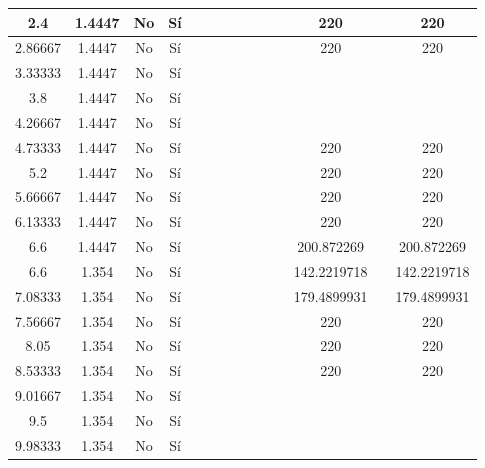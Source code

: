 \begin{table}[H]
{\begin{tabular}{|c|c|c|c|c|c|c|c|c|c|c|c|c|c|}
\hline
2.4 & 1.4447 & No  & Sí  &     &     &     &     &     &     &     & 220 &     & 220 \bigstrut\\
\hline
2.86667 & 1.4447 & No  & Sí  &     &     &     &     &     &     &     & 220 &     & 220 \bigstrut\\
\hline
3.33333 & 1.4447 & No  & Sí  &     &     &     &     &     &     &     &     &     &  \bigstrut\\
\hline
3.8 & 1.4447 & No  & Sí  &     &     &     &     &     &     &     &     &     &  \bigstrut\\
\hline
4.26667 & 1.4447 & No  & Sí  &     &     &     &     &     &     &     &     &     &  \bigstrut\\
\hline
4.73333 & 1.4447 & No  & Sí  &     &     &     &     &     &     &     & 220 &     & 220 \bigstrut\\
\hline
5.2 & 1.4447 & No  & Sí  &     &     &     &     &     &     &     & 220 &     & 220 \bigstrut\\
\hline
5.66667 & 1.4447 & No  & Sí  &     &     &     &     &     &     &     & 220 &     & 220 \bigstrut\\
\hline
6.13333 & 1.4447 & No  & Sí  &     &     &     &     &     &     &     & 220 &     & 220 \bigstrut\\
\hline
6.6 & 1.4447 & No  & Sí  &     &     &     &     &     &     &     & 200.872269 &     & 200.872269 \bigstrut\\
\hline
6.6 & 1.354 & No  & Sí  &     &     &     &     &     &     &     & 142.2219718 &     & 142.2219718 \bigstrut\\
\hline
7.08333 & 1.354 & No  & Sí  &     &     &     &     &     &     &     & 179.4899931 &     & 179.4899931 \bigstrut\\
\hline
7.56667 & 1.354 & No  & Sí  &     &     &     &     &     &     &     & 220 &     & 220 \bigstrut\\
\hline
8.05 & 1.354 & No  & Sí  &     &     &     &     &     &     &     & 220 &     & 220 \bigstrut\\
\hline
8.53333 & 1.354 & No  & Sí  &     &     &     &     &     &     &     & 220 &     & 220 \bigstrut\\
\hline
9.01667 & 1.354 & No  & Sí  &     &     &     &     &     &     &     &     &     &  \bigstrut\\
\hline
9.5 & 1.354 & No  & Sí  &     &     &     &     &     &     &     &     &     &  \bigstrut\\
\hline
9.98333 & 1.354 & No  & Sí  &     &     &     &     &     &     &     &     &     &  \bigstrut\\

\end{tabular}}
\end{table}
